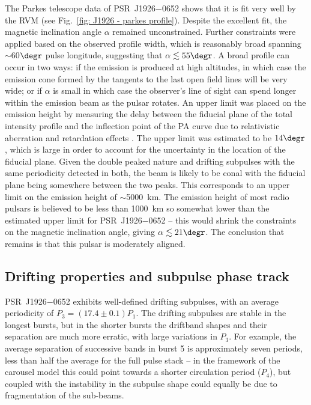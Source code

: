 The Parkes telescope data of PSR~J1926$-$0652 shows that it is fit very well by the RVM (see Fig.~\ref{fig: J1926 - parkes profile}). Despite the excellent fit, the magnetic inclination angle $\alpha$ remained unconstrained. Further constraints were applied based on the observed profile width, which is reasonably broad spanning $\sim$60$\degr$ pulse longitude, suggesting that $\alpha \lesssim 55\degr$. A broad profile can occur in two ways: if the emission is produced at high altitudes, in which case the emission cone formed by the tangents to the last open field lines will be very wide; or if $\alpha$ is small in which case the observer's line of sight can spend longer within the emission beam as the pulsar rotates. An upper limit was placed on the emission height by measuring the delay between the fiducial plane of the total intensity profile and the inflection point of the PA curve due to relativistic aberration and retardation effects \citep{BCWx1991}. The upper limit was estimated to be $14\degr$, which is large in order to account for the uncertainty in the location of the fiducial plane. Given the double peaked nature and drifting subpulses with the same periodicity detected in both, the beam is likely to be conal \citep{Rxxx1983a} with the fiducial plane being somewhere between the two peaks. This corresponds to an upper limit on the emission height of $\sim$5000~km. The emission height of most radio pulsars is believed to be less than 1000~km \citep[e.g.][]{KJxx2007,JKxx2019,JSKx2020} so somewhat lower than the estimated upper limit for PSR~J1926$-$0652 -- this would shrink the constraints on the magnetic inclination angle, giving $\alpha \lesssim 21\degr$. The conclusion that remains is that this pulsar is moderately aligned.






\subsection{Drifting properties and subpulse phase track}
\label{sec: J1926 - discuss - phase track}


PSR~J1926$-$0652 exhibits well-defined drifting subpulses, with an average periodicity of $P_3 = (17.4 \pm 0.1) P_1$. The drifting subpulses are stable in the longest bursts, but in the shorter bursts the driftband shapes and their separation are much more erratic, with large variations in $P_3$. For example, the average separation of successive bands in burst 5 is approximately seven periods, less than half the average for the full pulse stack -- in the framework of the carousel model this could point towards a shorter circulation period ($P_4$), but coupled with the instability in the subpulse shape could equally be due to fragmentation of the sub-beams.

